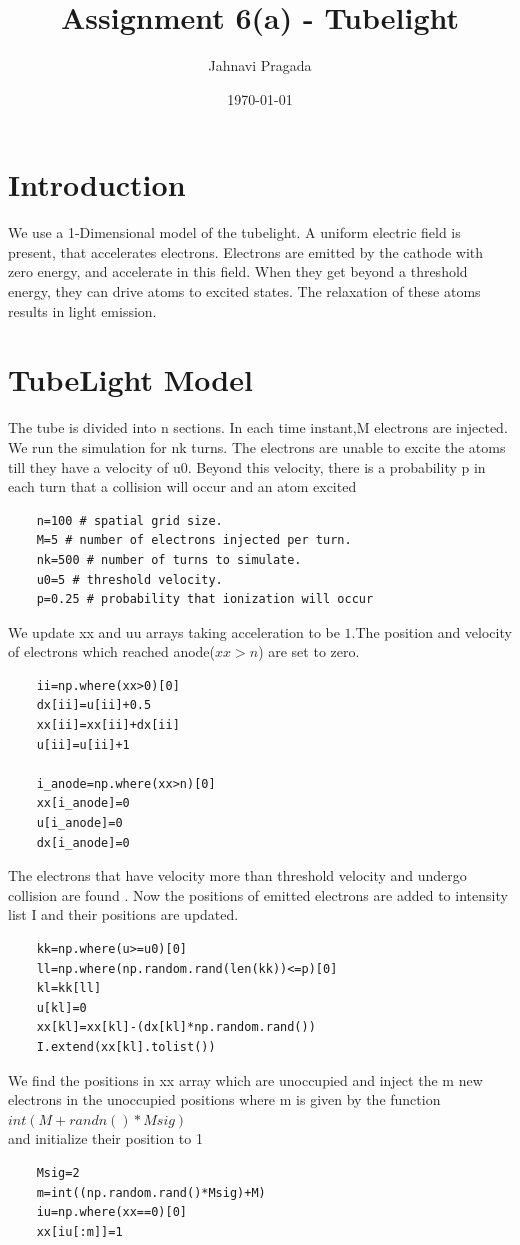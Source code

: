 \documentclass[12pt, a4paper]{article}
\title{Assignment 6(a) - Tubelight} %
\author{Jahnavi Pragada} %
\date{\today} %
\begin{document}
\maketitle
\section*{Introduction}
We use a 1-Dimensional model of the tubelight.  A uniform electric field is present, that accelerates electrons.  Electrons are emitted by the cathode with zero energy, and accelerate in this field.  When they get beyond a threshold energy, they can drive atoms to excited states. The relaxation of these atoms results in light emission.
\section*{TubeLight Model}
The tube is divided into n sections. In each time instant,M electrons are injected. We run the simulation for nk turns. The electrons are unable to excite the atoms till they have a velocity of u0. Beyond this velocity, there is a probability p in each turn that a collision will occur and an atom excited
\begin{verbatim}
    n=100 # spatial grid size.
    M=5 # number of electrons injected per turn.
    nk=500 # number of turns to simulate.
    u0=5 # threshold velocity.
    p=0.25 # probability that ionization will occur
\end{verbatim} 
We update xx and uu arrays taking acceleration to be $1$.The position and velocity of electrons which reached anode($xx>n$) are set to zero.
\begin{verbatim}
    ii=np.where(xx>0)[0] 
    dx[ii]=u[ii]+0.5         	
    xx[ii]=xx[ii]+dx[ii]     
    u[ii]=u[ii]+1            
    
    i_anode=np.where(xx>n)[0]
    xx[i_anode]=0
    u[i_anode]=0
    dx[i_anode]=0
\end{verbatim}
The electrons that have velocity more than threshold velocity and undergo collision are found . Now the positions of emitted electrons are added to intensity list I and their positions are updated.
\begin{verbatim}
    kk=np.where(u>=u0)[0]
    ll=np.where(np.random.rand(len(kk))<=p)[0]
    kl=kk[ll]
    u[kl]=0
    xx[kl]=xx[kl]-(dx[kl]*np.random.rand())
    I.extend(xx[kl].tolist())
\end{verbatim}
We find the positions in xx array which are unoccupied and inject the m new electrons in the unoccupied positions where m is given by the function $int(M+randn()*Msig)$\\ and initialize their position to 1
\begin{verbatim}
    Msig=2
    m=int((np.random.rand()*Msig)+M)
    iu=np.where(xx==0)[0]	
    xx[iu[:m]]=1
\end{verbatim}
\end{document}
